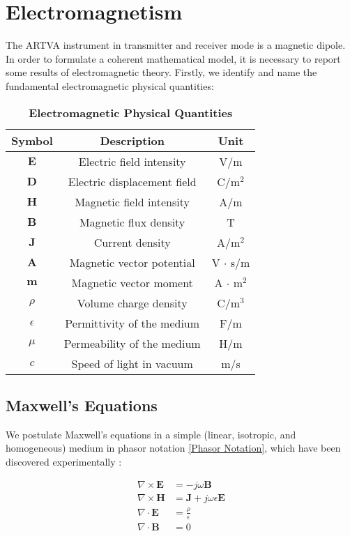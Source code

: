 \chapter{Electromagnetism}

The ARTVA instrument in transmitter and receiver 
mode is a magnetic dipole. In order to formulate 
a coherent mathematical model, it is necessary to 
report some results of electromagnetic theory. 
Firstly, we identify and name the fundamental 
electromagnetic physical quantities:
\begin{table}[h!]
    \centering
    \caption{\textbf{Electromagnetic Physical 
    Quantities}}
    \begin{tabular}{ccc}
        \hline\hline
        \textbf{Symbol} & \textbf{Description} & \textbf{Unit} \\
        \hline
        $\mathbf{E}$ & Electric field intensity & V/m \\
        $\mathbf{D}$ & Electric displacement field & C/m$^2$ \\
        $\mathbf{H}$ & Magnetic field intensity & A/m \\
        $\mathbf{B}$ & Magnetic flux density & T \\
        $\mathbf{J}$ & Current density & A/m$^2$ \\
        $\mathbf{A}$ & Magnetic vector potential & V $\cdot$ s/m \\
        $\mathbf{m}$ & Magnetic vector moment & A $\cdot$ m$^2$ \\
        $\rho$ & Volume charge density & C/m$^3$ \\
        $\epsilon$ & Permittivity of the medium & F/m \\
        $\mu$ & Permeability of the medium & H/m \\
        $c$ & Speed of light in vacuum & m/s \\
        \hline\hline
    \end{tabular}
    \label{tab:symbols}
\end{table}

\section{Maxwell's Equations}

We postulate Maxwell's equations in a simple 
(linear, isotropic, and homogeneous) medium in 
phasor notation \ref{Phasor Notation}, which have 
been discovered experimentally \cite{book-magnetism}:

\begin{align}
    \nabla \times \mathbf{E} &= -j\omega \mathbf{B} 
    \label{eq:curl_E} \\
    \nabla \times \mathbf{H} &= \mathbf{J} + j\omega 
    \epsilon \mathbf{E} \label{eq:curl_H} \\
    \nabla \cdot \mathbf{E} &= \frac{\rho}{\epsilon} 
    \label{eq:E} \\
    \nabla \cdot \mathbf{B} &= 0 \label{eq:B}
\end{align}

